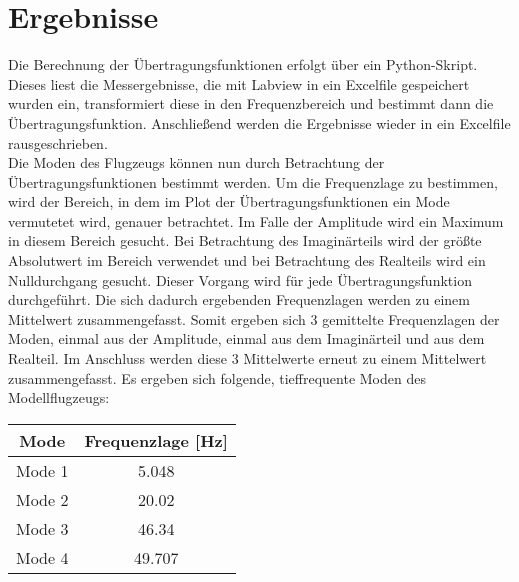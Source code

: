 \section{Ergebnisse}
    Die Berechnung der Übertragungsfunktionen erfolgt über ein Python-Skript.
    Dieses liest die Messergebnisse, die mit Labview in ein  Excelfile
    gespeichert wurden ein, transformiert diese in den Frequenzbereich und
    bestimmt dann die Übertragungsfunktion. Anschließend werden die Ergebnisse
    wieder in ein Excelfile rausgeschrieben.
    \\

    \noindent
    Die Moden des Flugzeugs können nun durch Betrachtung der
    Übertragungsfunktionen bestimmt werden. Um die Frequenzlage zu bestimmen,
    wird der Bereich, in dem im Plot der Übertragungsfunktionen ein Mode
    vermutetet wird, genauer betrachtet. Im Falle der Amplitude wird ein
    Maximum in diesem Bereich gesucht. Bei Betrachtung des Imaginärteils wird der
    größte Absolutwert im Bereich verwendet und bei Betrachtung des Realteils
    wird ein Nulldurchgang gesucht. Dieser Vorgang wird für jede
    Übertragungsfunktion durchgeführt. Die sich dadurch ergebenden
    Frequenzlagen werden zu einem Mittelwert zusammengefasst. Somit ergeben sich
    3 gemittelte Frequenzlagen der Moden, einmal aus der Amplitude, einmal aus 
    dem Imaginärteil und aus dem Realteil. Im Anschluss werden diese 3
    Mittelwerte erneut zu einem Mittelwert zusammengefasst. Es ergeben sich
    folgende, tieffrequente Moden des Modellflugzeugs:

    \begin{table}[H]
        \centering
        \begin{tabular}{|c|c|}
            \hline
            \textbf{Mode}   &   \textbf{Frequenzlage [Hz]}  \\
            \hline \hline
            Mode 1  &   5.048 \\
            \hline
            Mode 2  &   20.02 \\
            \hline
            Mode 3  &   46.34 \\
            \hline
            Mode 4  &   49.707 \\
            \hline            
        \end{tabular}
    \end{table}

